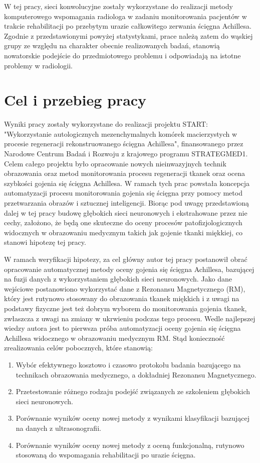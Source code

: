 W tej pracy, sieci konwolucyjne zostały wykorzystane do realizacji metody komputerowego wspomagania radiologa w zadaniu monitorowania pacjentów w trakcie rehabilitacji po przebytym urazie całkowitego zerwania ścięgna Achillesa. Zgodnie z przedstawionymi powyżej statystykami, prace należą zatem do wąskiej grupy ze względu na charakter obecnie realizowanych badań, stanowią nowatorskie podejście do przedmiotowego problemu i odpowiadają na istotne problemy w radiologii.


\chapter{Cel i przebieg pracy}

Wyniki pracy zostały wykorzystane do realizacji projektu START: "Wykorzystanie autologicznych mezenchymalnych komórek macierzystych w procesie regeneracji rekonstruowanego ścięgna Achillesa", finansowanego przez Narodowe Centrum Badań i Rozwoju z krajowego programu STRATEGMED1. Celem całego projektu było opracowanie nowych nieinwazyjnych technik obrazowania oraz metod monitorowania procesu regeneracji tkanek oraz ocena szybkości gojenia się ścięgna Achillesa. W ramach tych prac powstała koncepcja automatyzacji procesu monitorowania gojenia się ścięgna przy pomocy metod przetwarzania obrazów i sztucznej inteligencji. Biorąc pod uwagę przedstawioną dalej w tej pracy budowę głębokich sieci neuronowych i ekstrahowane przez nie cechy, założono, że będą one skuteczne do oceny procesów patofizjologicznych widocznych w obrazowaniu medycznym takich jak gojenie tkanki miękkiej, co stanowi hipotezę tej pracy.

W ramach weryfikacji hipotezy, za cel główny autor tej pracy postanowił obrać opracowanie automatycznej metody oceny gojenia się ścięgna Achillesa, bazującej na fuzji danych z wykorzystaniem głębokich sieci neuronowych. Jako dane wejściowe postanowiono wykorzystać dane z Rezonansu Magnetycznego (RM), który jest rutynowo stosowany do obrazowania tkanek miękkich i z uwagi na podstawy fizyczne jest też dobrym wyborem do monitorowania gojenia tkanek, zwłaszcza z uwagi na zmiany w ukrwieniu podczas tego procesu. Wedle najlepszej wiedzy autora jest to pierwsza próba automatyzacji oceny gojenia się ścięgna Achillesa widocznego w obrazowaniu medycznym RM. Stąd konieczność zrealizowania celów pobocznych, które stanowią:
\begin{enumerate}
	\item Wybór efektywnego kosztowo i czasowo protokołu badania bazującego na technikach obrazowania medycznego, a dokładniej Rezonansu Magnetycznego.
	\item Przetestowanie różnego rodzaju podejść związanych ze szkoleniem głębokich sieci neuronowych.
	\item Porównanie wyników oceny nowej metody z wynikami klasyfikacji bazującej na danych z ultrasonografii.
	\item Porównanie wyników oceny nowej metody z oceną funkcjonalną, rutynowo stosowaną do wspomagania rehabilitacji po urazie ścięgna.
\end{enumerate}

